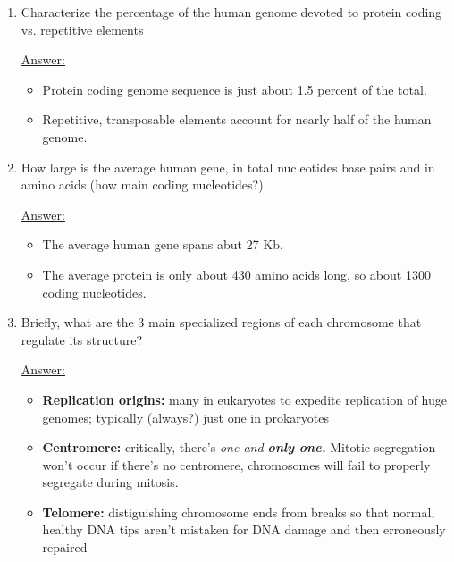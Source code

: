 \documentclass{article}
\newenvironment{QandA}{\begin{enumerate}[label=\bfseries Q\arabic*.]}
                       {\end{enumerate}}
\newenvironment{answered}{\par\normalfont\underline{Answer:}}{}
\begin{document}
\begin{QandA}
    \begin{answered}
    The nucleus is an instance of the more general strategy of \textit{compartmentalization,} making desirable \textit{molecular collisions more likely.} It shifts the \textit{probability distribution}  of molecular collisions in a productive way.
    \end{answered}
  \item{Characterize the percentage of the human genome devoted to protein coding vs. repetitive elements}
    \begin{answered}
    \begin{itemize}
      \item{Protein coding genome sequence is just about 1.5 percent of the total.}
      \item{Repetitive, transposable elements account for nearly half of the human genome.}
    \end{itemize}
    \end{answered}
  \item{How large is the average human gene, in total nucleotides base pairs and in amino acids (how main coding nucleotides?)}
    \begin{answered}
    \begin{itemize}
      \item{The average human gene spans abut 27 Kb.}
      \item{The average protein is only about 430 amino acids long, so about 1300 coding nucleotides.}
    \end{itemize}
    \end{answered}
  \item{Briefly, what are the 3 main specialized regions of each chromosome that regulate its structure?}
    \begin{answered}
    \begin{itemize}
      \item{\textbf{Replication origins:} many in eukaryotes to expedite replication of huge genomes; typically (always?) just one in prokaryotes}
      \item{\textbf{Centromere:} critically, there's \textit{one and \textbf{only one.}} Mitotic segregation won't occur if there's no centromere, chromosomes will fail to properly segregate during mitosis.}
      \item{\textbf{Telomere:} distiguishing chromosome ends from breaks so that normal, healthy DNA tips aren't mistaken for DNA damage and then erroneously repaired}
    \end{itemize}

\end{answered}
\end{QandA}
\end{document}
